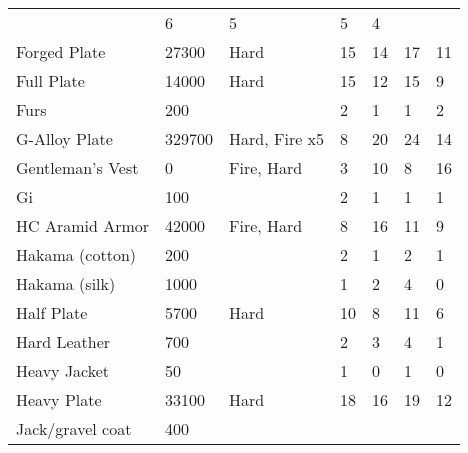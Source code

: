 \documentclass[twoside]{book}
\begin{document}
\begin{longtable}{p{1.25in}llp{2em}p{2em}p{2em}p{2em}}
  &
   6 
  &
   5 
  &
   5 
  &
   4 
  \tabularnewline
      
  \raggedright
           Forged Plate 
  &
   27300 
  &
   Hard 
  &
   15 
  &
   14 
  &
   17 
  &
   11 
  \tabularnewline
      
  \raggedright
           Full Plate 
  &
   14000 
  &
   Hard 
  &
   15 
  &
   12 
  &
   15 
  &
   9 
  \tabularnewline
      
  \raggedright
           Furs 
  &
   200 
  &
  
  &
   2 
  &
   1 
  &
   1 
  &
   2 
  \tabularnewline
      
  \raggedright
           G-Alloy Plate 
  &
   329700 
  &
   Hard, Fire x5 
  &
   8 
  &
   20 
  &
   24 
  &
   14 
  \tabularnewline
      
  \raggedright
           Gentleman's Vest 
  &
   0 
  &
   Fire, Hard 
  &
   3 
  &
   10 
  &
   8 
  &
   16 
  \tabularnewline
      
  \raggedright
           Gi 
  &
   100 
  &
  
  &
   2 
  &
   1 
  &
   1 
  &
   1 
  \tabularnewline
      
  \raggedright
           HC Aramid Armor 
  &
   42000 
  &
   Fire, Hard 
  &
   8 
  &
   16 
  &
   11 
  &
   9 
  \tabularnewline
      
  \raggedright
           Hakama (cotton) 
  &
   200 
  &
  
  &
   2 
  &
   1 
  &
   2 
  &
   1 
  \tabularnewline
      
  \raggedright
           Hakama (silk) 
  &
   1000 
  &
  
  &
   1 
  &
   2 
  &
   4 
  &
   0 
  \tabularnewline
      
  \raggedright
           Half Plate 
  &
   5700 
  &
   Hard 
  &
   10 
  &
   8 
  &
   11 
  &
   6 
  \tabularnewline
      
  \raggedright
           Hard Leather 
  &
   700 
  &
  
  &
   2 
  &
   3 
  &
   4 
  &
   1 
  \tabularnewline
      
  \raggedright
           Heavy Jacket 
  &
   50 
  &
  
  &
   1 
  &
   0 
  &
   1 
  &
   0 
  \tabularnewline
      
  \raggedright
           Heavy Plate 
  &
   33100 
  &
   Hard 
  &
   18 
  &
   16 
  &
   19 
  &
   12 
  \tabularnewline
      
  \raggedright
           Jack/gravel coat 
  &
   400 
  &
  

\end{longtable}
\end{document}
